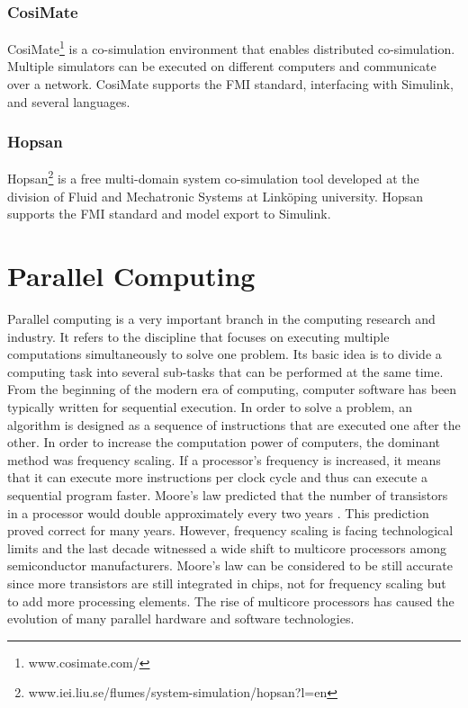 \subsubsection{CosiMate}

CosiMate\footnote{www.cosimate.com/} is a co-simulation environment that enables distributed co-simulation. Multiple simulators can be executed on different computers and communicate over a network. CosiMate supports the FMI standard, interfacing with Simulink, and several languages.

\subsubsection{Hopsan}
Hopsan\footnote{www.iei.liu.se/flumes/system-simulation/hopsan?l=en} is a free multi-domain system co-simulation tool developed at the division of Fluid and Mechatronic Systems at Link\"oping university. Hopsan supports the FMI standard and model export to Simulink.

\section{Parallel Computing}

Parallel computing is a very important branch in the computing research and industry. It refers to the discipline that focuses on executing multiple computations simultaneously to solve one problem. Its basic idea is to divide a computing task into several sub-tasks that can be performed at the same time. From the beginning of the modern era of computing, computer software has been typically written for sequential execution. In order to solve a problem, an algorithm is designed as a sequence of instructions that are executed one after the other. In order to increase the computation power of computers, the dominant method was frequency scaling. If a processor's frequency is increased, it means that it can execute more instructions per clock cycle and thus can execute a sequential program faster. Moore's law predicted that the number of transistors in a processor would double approximately every two years \cite{moore:1965}. This prediction proved correct for many years. However, frequency scaling is facing technological limits and the last decade witnessed a wide shift to multicore processors among semiconductor manufacturers. Moore's law can be considered to be still accurate since more transistors are still integrated in chips, not for frequency scaling but to add more processing elements. The rise of multicore processors has caused the evolution of many parallel hardware and software technologies.

